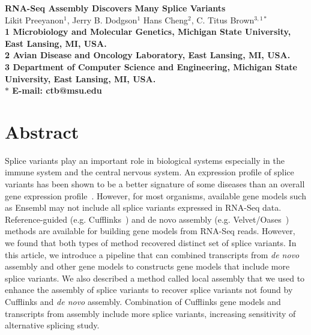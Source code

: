 \documentclass[10pt]{article}
\date{}
\begin{document}
\begin{flushleft}
{\Large
\textbf{RNA-Seq Assembly Discovers Many Splice Variants}
}
\\
Likit Preeyanon$^{1}$, 
Jerry B. Dodgson$^{1}$
Hans Cheng$^{2}$, 
C. Titus Brown$^{3,1 \ast}$
\\
\bf{1} Microbiology and Molecular Genetics, Michigan State University, East Lansing, MI, USA.
\\
\bf{2} Avian Disease and Oncology Laboratory, East Lansing, MI, USA.
\\

\bf{3} Department of Computer Science and Engineering, Michigan State University, East Lansing, MI, USA.
\\
$\ast$ E-mail: ctb@msu.edu
\end{flushleft}

\section*{Abstract}
Splice variants play an important role in biological systems especially in the
immune system and the central nervous system. An expression profile of splice
variants has been shown to be a better signature of some diseases than an
overall gene expression profile~\cite{zhang2013isoform}. However, for most
organisms, available gene models such as Ensembl may not include all splice
variants expressed in RNA-Seq data. Reference-guided (e.g.
Cufflinks~\cite{Trapnell:2010kd}) and de novo assembly (e.g.
Velvet/Oases~\cite{Schulz:2012je}) methods are available for building gene
models from RNA-Seq reads. However, we found that both types of method recovered
distinct set of splice variants.  In this article, we introduce a pipeline that
can combined transcripts from {\em de novo} assembly and other gene models to
constructs gene models that include more splice variants. We also described a
method called local assembly that we used to enhance the assembly of splice
variants to recover splice variants not found by Cufflinks and {\em de novo}
assembly.  Combination of Cufflinks gene models and transcripts from assembly
include more splice variants, increasing sensitivity of alternative splicing
study.
\end{document}
